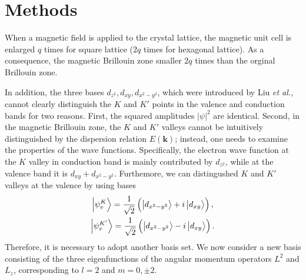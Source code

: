 \documentclass{article}
\begin{document}
\section{Methods}

When a magnetic field is applied to the crystal lattice, the magnetic unit cell is enlarged $q$ times for square lattice ($2q$ times for hexagonal lattice). As a consequence, the magnetic Brillouin zone smaller $2q$ times than the orginal Brillouin zone.

In addition, the three bases $d_{z^{2}}, d_{xy}, d_{x^{2}-y^{2}}$, which were introduced by Liu \textit{et al.}, cannot clearly distinguish the $K$ and $K'$ points in the valence and conduction bands for two reasons. First, the squared amplitudes $|\psi|^{2}$ are identical. Second, in the magnetic Brillouin zone, the $K$ and $K'$ valleys cannot be intuitively distinguished by the dispersion relation $E(\mathbf{k})$; instead, one needs to examine the properties of the wave functions. Specifically, the electron wave function at the $K$ valley in conduction band is mainly contributed by $d_{z^{2}}$, while at the valence band it is $d_{xy} + d_{x^{2}-y^{2}}$. Furthemore, we can distingushed $K$ and $K'$ valleys at the valence by using bases
\begin{gather}
	\ket{\psi_{v}^{K}} = \frac{1}{\sqrt{2}} \left( \ket{d_{x^{2} - y^{2}}} + i \ket{d_{xy}} \right),\\
	\ket{\psi_{v}^{K'}} = \frac{1}{\sqrt{2}} \left( \ket{d_{x^{2} - y^{2}}} - i \ket{d_{xy}} \right).
\end{gather}
Therefore, it is necessary to adopt another basis set. We now consider a new basis consisting of the three eigenfunctions of the angular momentum operators $L^{2}$ and $L_{z}$, corresponding to $l = 2$ and $m = 0, \pm 2$.
\end{document}
